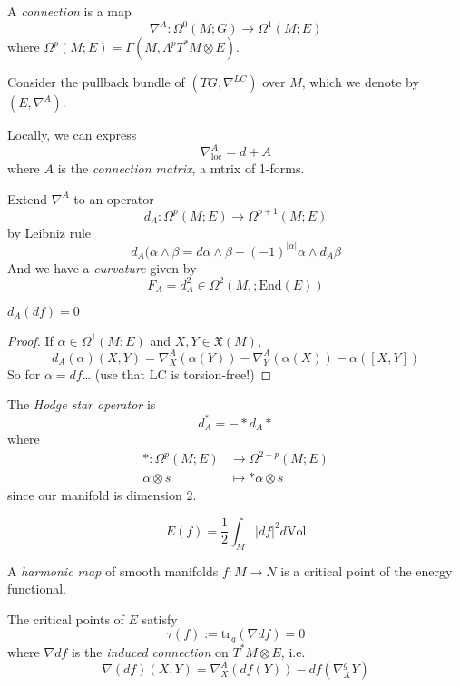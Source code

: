 \begin{definition}
\label{definition-connection}
A {\it connection} is a map
$$
\nabla^A:\Omega^{0}(M;G)\to \Omega^{1}(M;E)
$$
where $\Omega^{p}(M;E)=\Gamma(M,\Lambda^{p}T^*M\otimes E)$.
\end{definition}

Consider the pullback bundle of $(TG,\nabla^{LC})$ over $M$, which we denote by
$(E,\nabla^A)$.

Locally, we can express
$$
\nabla^A_{\text{loc}}=d+A
$$
where $A$ is the {\it connection matrix}, a mtrix of 1-forms.

Extend  $\nabla^A$ to an operator
$$
d_A:\Omega^{p}(M;E)\to \Omega^{p+1}(M;E)
$$
by Leibniz rule
$$
d_A(\alpha\wedge\beta=d\alpha\wedge\beta+(-1)^{|\alpha|}\alpha\wedge d_A\beta
$$
And we have a {\it curvature} given by
$$
F_A=d^2_A\in\Omega^{2}(M,;\text{End}(E))
$$

\begin{lemma}
\label{lemma-derivative-of-differential}
$d_A(df)=0$
\end{lemma}

\begin{proof}
If $\alpha\in\Omega^{1}(M;E)$ and $X,Y\in\mathfrak{X}(M)$,
$$
d_A(\alpha)(X,Y)=\nabla_X^A(\alpha(Y))-\nabla_Y^A(\alpha(X))-\alpha([X,Y])
$$
So for $\alpha=df$… (use that LC is torsion-free!)
\end{proof}

\begin{definition}
\label{definition-Hodge-star}
The {\it Hodge star operator} is
$$
d^*_A=-*d_A*
$$
where
\begin{align*}
*: \Omega^{p}(M;E) &\longrightarrow \Omega^{2-p}(M;E) \\
\alpha\otimes s &\longmapsto *\alpha\otimes s
\end{align*}
since our manifold is dimension 2.
\end{definition}

\begin{definition}
\label{definition-energy-functional}
$$
E(f)=\frac{1}{2}\int_M|df|^2d\text{Vol}
$$
\end{definition}

\begin{definition}
\label{definition-harmonic-map}
A {\it harmonic map} of smooth manifolds $f:M\to N$ is a critical point of the
energy functional.
\end{definition}

\begin{lemma}
\label{lemma-critical-points-of-energy-functional}
The critical points of $E$ satisfy
$$
\tau(f):=\text{tr}_g(\nabla df)=0
$$
where $\nabla df$ is the {\it induced connection} on $T^*M\otimes E$, i.e.
$$
\nabla(df)(X,Y)=\nabla_X^A(df(Y))-df(\nabla_X^gY)
$$
\end{lemma}

